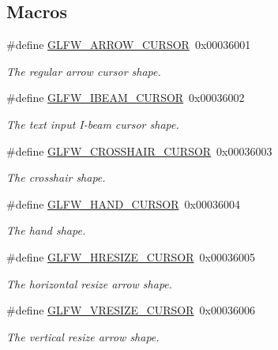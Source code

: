 \subsection*{Macros}
\begin{DoxyCompactItemize}
\item 
\#define \hyperlink{group__shapes_ga8ab0e717245b85506cb0eaefdea39d0a}{G\+L\+F\+W\+\_\+\+A\+R\+R\+O\+W\+\_\+\+C\+U\+R\+S\+OR}~0x00036001
\begin{DoxyCompactList}\small\item\em The regular arrow cursor shape. \end{DoxyCompactList}\item 
\#define \hyperlink{group__shapes_ga36185f4375eaada1b04e431244774c86}{G\+L\+F\+W\+\_\+\+I\+B\+E\+A\+M\+\_\+\+C\+U\+R\+S\+OR}~0x00036002
\begin{DoxyCompactList}\small\item\em The text input I-\/beam cursor shape. \end{DoxyCompactList}\item 
\#define \hyperlink{group__shapes_ga8af88c0ea05ab9e8f9ac1530e8873c22}{G\+L\+F\+W\+\_\+\+C\+R\+O\+S\+S\+H\+A\+I\+R\+\_\+\+C\+U\+R\+S\+OR}~0x00036003
\begin{DoxyCompactList}\small\item\em The crosshair shape. \end{DoxyCompactList}\item 
\#define \hyperlink{group__shapes_ga1db35e20849e0837c82e3dc1fd797263}{G\+L\+F\+W\+\_\+\+H\+A\+N\+D\+\_\+\+C\+U\+R\+S\+OR}~0x00036004
\begin{DoxyCompactList}\small\item\em The hand shape. \end{DoxyCompactList}\item 
\#define \hyperlink{group__shapes_gabb3eb0109f11bb808fc34659177ca962}{G\+L\+F\+W\+\_\+\+H\+R\+E\+S\+I\+Z\+E\+\_\+\+C\+U\+R\+S\+OR}~0x00036005
\begin{DoxyCompactList}\small\item\em The horizontal resize arrow shape. \end{DoxyCompactList}\item 
\#define \hyperlink{group__shapes_gaf024f0e1ff8366fb2b5c260509a1fce5}{G\+L\+F\+W\+\_\+\+V\+R\+E\+S\+I\+Z\+E\+\_\+\+C\+U\+R\+S\+OR}~0x00036006
\begin{DoxyCompactList}\small\item\em The vertical resize arrow shape. \end{DoxyCompactList}\item 

\end{DoxyCompactItemize}
